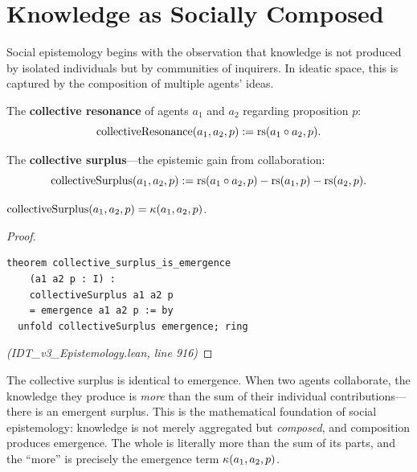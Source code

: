 \section{Knowledge as Socially Composed}

Social epistemology begins with the observation that knowledge is not produced
by isolated individuals but by communities of inquirers. In ideatic space, this
is captured by the composition of multiple agents' ideas.

\begin{definition}
\label{def:collective-resonance}
The \textbf{collective resonance} of agents $a_1$ and $a_2$ regarding
proposition $p$:
\[
  \mathrm{collectiveResonance}(a_1, a_2, p) := \mathrm{rs}(a_1 \circ a_2, p).
\]
\end{definition}

\begin{definition}
\label{def:collective-surplus}
The \textbf{collective surplus}---the epistemic gain from collaboration:
\[
  \mathrm{collectiveSurplus}(a_1, a_2, p) := \mathrm{rs}(a_1 \circ a_2, p) - \mathrm{rs}(a_1, p) - \mathrm{rs}(a_2, p).
\]
\end{definition}

\begin{theorem}
\label{thm:collective-surplus-emergence}
$\mathrm{collectiveSurplus}(a_1, a_2, p) = \kappa(a_1, a_2, p)$.
\end{theorem}

\begin{proof}
\begin{lstlisting}
theorem collective_surplus_is_emergence
    (a1 a2 p : I) :
    collectiveSurplus a1 a2 p
    = emergence a1 a2 p := by
  unfold collectiveSurplus emergence; ring
\end{lstlisting}
\textit{(IDT\_v3\_Epistemology.lean, line 916)}
\end{proof}

\begin{interpretation}
The collective surplus is identical to emergence. When two agents collaborate,
the knowledge they produce is \emph{more} than the sum of their individual
contributions---there is an emergent surplus. This is the mathematical
foundation of social epistemology: knowledge is not merely aggregated but
\emph{composed}, and composition produces emergence. The whole is literally
more than the sum of its parts, and the ``more'' is precisely the emergence
term $\kappa(a_1, a_2, p)$.
\end{interpretation}

